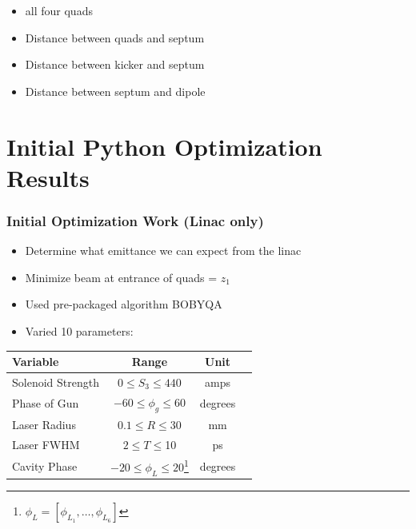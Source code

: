 \documentclass{beamer}
\begin{document}
\begin{frame}
{\begin{center}
\begin{tikzpicture}[scale=0.7]
                \end{tikzpicture}
   \end{center}
}
\begin{itemize}
	\item all four quads 
	\item Distance between quads and septum
	\item Distance between kicker and septum
	\item Distance between septum and dipole
\end{itemize}

\end{frame}

\section{Initial Python Optimization Results}
\begin{frame}
	\frametitle{Initial Optimization Work (Linac only)}
	  \begin{minipage}{0.9\textwidth}
	  \begin{itemize}
	  	\item{Determine what emittance we can expect from the linac}
	  	\item{Minimize beam at entrance of quads = $z_1$}
	  	\item{Used pre-packaged algorithm BOBYQA}
	  	\item{Varied 10 parameters:}
	  \end{itemize}
       \centering
		\setcounter{mpfootnote}{\value{footnote}}%
 		\renewcommand{\thempfootnote}{\arabic{mpfootnote}}%
       \begin{tabular}{ l *{3}{c}}
       	\textbf{Variable} & \textbf{Range} & \textbf{Unit} \\
       	\midrule
       	Solenoid Strength & $ 0 \le S_3 \le 440$  & amps \\
       	Phase of Gun & $-60 \le \phi_g \le 60$  & degrees \\
       	Laser Radius  & $0.1 \le R \le 30$  & mm \\
       	Laser FWHM  & $2 \le T \le $10  & ps \\
       	Cavity Phase & $-20 \le \phi_L \le 20$\footnote[1]{$\phi_L=[\phi_{L_1},\ldots,\phi_{L_6}]$} & degrees
       	\end{tabular}
       \end{minipage}
\end{frame}
\end{document}
